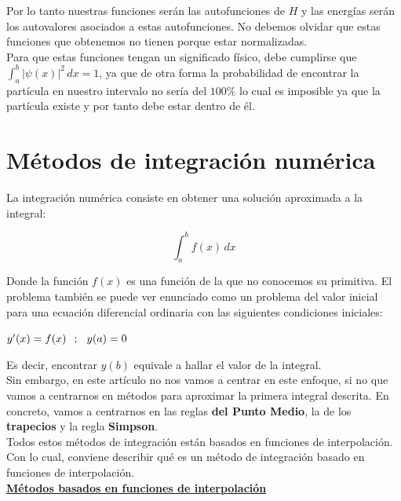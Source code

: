 \documentclass{article}
\begin{document}
Por lo tanto nuestras funciones serán las autofunciones de $H$ y las energías serán los autovalores asociados a estas autofunciones. No debemos olvidar que estas funciones que obtenemos no tienen porque estar normalizadas.\\

Para que estas funciones tengan un significado físico, debe cumplirse que $\int_{a}^{b}  |\psi(x)|^2\,dx =1$, ya que de otra forma la probabilidad de encontrar la partícula en nuestro intervalo no sería del $100\%$ lo cual es imposible ya que la partícula existe y por tanto debe estar dentro de él.
\newpage

\section{Métodos de integración numérica}

La integración numérica consiste en obtener una solución aproximada a la integral:

\begin{equation}
	\int_{a}^{b} f(x) \,dx 
\end{equation}

Donde la función $f(x)$ es una función de la que no conocemos su primitiva.
El problema también se puede ver enunciado como un problema del valor inicial 
para una ecuación diferencial ordinaria con las siguientes condiciones iniciales:

\begin{center}
	$y'(x)=f(x) \hspace{2.5mm} ; \hspace{2.5mm} y(a)=0$\\
\end{center}

Es decir, encontrar $y(b)$ equivale a hallar el valor de la integral. \\

Sin embargo, en este artículo no nos vamos a centrar en este enfoque, si no que vamos a centrarnos en métodos para aproximar la primera integral descrita.
En concreto, vamos a centrarnos en las reglas \textbf{del Punto Medio}, la de los \textbf{trapecios} y la regla \textbf{Simpson}. \\

Todos estos métodos de integración están basados en funciones de interpolación.
Con lo cual, conviene describir qué es un método de integración basado en funciones de interpolación.\\

\underline{\textbf{Métodos basados en funciones de interpolación}} \\
\end{document}
